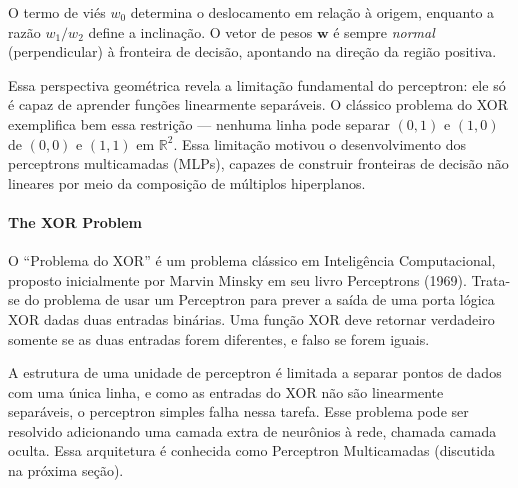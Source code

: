\documentclass{tufte-handout}
\begin{document}
O termo de viés $w_0$ determina o deslocamento em relação à origem, enquanto a razão $w_1/w_2$ define a inclinação. O vetor de pesos $\mathbf{w}$ é sempre \textit{normal} (perpendicular) à fronteira de decisão, apontando na direção da região positiva.

Essa perspectiva geométrica revela a limitação fundamental do perceptron: ele só é capaz de aprender funções linearmente separáveis. O clássico problema do XOR exemplifica bem essa restrição — nenhuma linha pode separar $(0,1)$ e $(1,0)$ de $(0,0)$ e $(1,1)$ em $\mathbb{R}^2$. Essa limitação motivou o desenvolvimento dos perceptrons multicamadas (MLPs), capazes de construir fronteiras de decisão não lineares por meio da composição de múltiplos hiperplanos.

\paragraph{The XOR Problem}

O “Problema do XOR” é um problema clássico em Inteligência Computacional, proposto inicialmente por Marvin Minsky em seu livro Perceptrons (1969). Trata-se do problema de usar um Perceptron para prever a saída de uma porta lógica XOR dadas duas entradas binárias. Uma função XOR deve retornar verdadeiro somente se as duas entradas forem diferentes, e falso se forem iguais.

A estrutura de uma unidade de perceptron é limitada a separar pontos de dados com uma única linha, e como as entradas do XOR não são linearmente separáveis, o perceptron simples falha nessa tarefa. Esse problema pode ser resolvido adicionando uma camada extra de neurônios à rede, chamada camada oculta. Essa arquitetura é conhecida como Perceptron Multicamadas (discutida na próxima seção).
\end{document}
